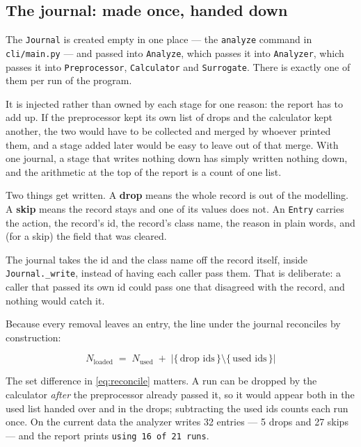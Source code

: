 \subsection{The journal: made once, handed down}

The \texttt{Journal} is created empty in one place --- the \texttt{analyze} command in
\texttt{cli/main.py} --- and passed into \texttt{Analyze}, which passes it into
\texttt{Analyzer}, which passes it into \texttt{Preprocessor}, \texttt{Calculator} and
\texttt{Surrogate}. There is exactly one of them per run of the program.

It is injected rather than owned by each stage for one reason: the report has to add up. If the
preprocessor kept its own list of drops and the calculator kept another, the two would have to
be collected and merged by whoever printed them, and a stage added later would be easy to leave
out of that merge. With one journal, a stage that writes nothing down has simply written nothing
down, and the arithmetic at the top of the report is a count of one list.

Two things get written. A \textbf{drop} means the whole record is out of the modelling. A
\textbf{skip} means the record stays and one of its values does not. An \texttt{Entry} carries
the action, the record's id, the record's class name, the reason in plain words, and (for a
skip) the field that was cleared.

The journal takes the id and the class name off the record itself, inside
\texttt{Journal.\_write}, instead of having each caller pass them. That is deliberate: a caller
that passed its own id could pass one that disagreed with the record, and nothing would catch
it.

Because every removal leaves an entry, the line under the journal reconciles by construction:

\begin{equation}
  \label{eq:reconcile}
  N_{\text{loaded}} \;=\; N_{\text{used}} \;+\; \bigl|\{\, \text{drop ids}\,\} \setminus
  \{\, \text{used ids}\,\}\bigr|
\end{equation}

The set difference in \eqref{eq:reconcile} matters. A run can be dropped by the calculator
\emph{after} the preprocessor already passed it, so it would appear both in the used list
handed over and in the drops; subtracting the used ids counts each run once. On the current
data the analyzer writes 32 entries --- 5 drops and 27 skips --- and the report prints
\texttt{using 16 of 21 runs}.

